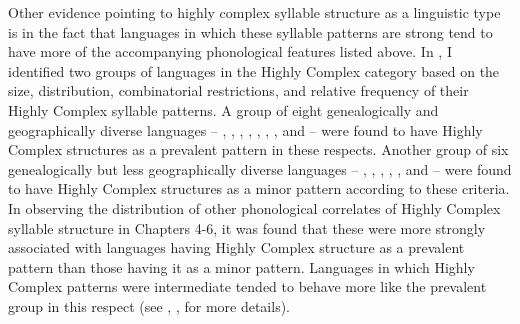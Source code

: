   Other evidence pointing to highly complex syllable structure as a linguistic type is in the fact that languages in which these syllable patterns are strong tend to have more of the accompanying phonological features listed above. In , I identified two groups of languages in the Highly Complex category based on the size, distribution, combinatorial restrictions, and relative frequency of their Highly Complex syllable patterns. A group of eight genealogically and geographically diverse languages -- , , , , , , , and  -- were found to have Highly Complex structures as a prevalent pattern in these respects. Another group of six genealogically but less geographically diverse languages -- , , , , , and  -- were found to have Highly Complex structures as a minor pattern according to these criteria. In observing the distribution of other phonological correlates of Highly Complex syllable structure in Chapters 4-6, it was found that these were more strongly associated with languages having Highly Complex structure as a prevalent pattern than those having it as a minor pattern. Languages in which Highly Complex patterns were intermediate tended to behave more like the prevalent group in this respect (see , ,  for more details).

